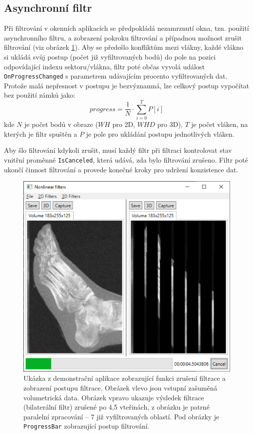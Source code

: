 \subsection*{Asynchronní filtr}
Při filtrování v okenních aplikacích se předpokládá nezamrznutí okna, tzn. použití asynchronního filtru, a zobrazení pokroku filtrování a případnou možnost zrušit filtrování (viz obrázek \ref{fig:impl:demo_cancel}).
Aby se předešlo konfliktům mezi vlákny, každé vlákno si ukládá svůj postup (počet již vyfiltrovaných bodů) do pole na pozici odpovídající indexu sektoru/vlákna, filtr poté občas vyvolá událost \texttt{OnProgressChanged} s parametrem udávajícím procento vyfiltrovaných dat. Protože malá nepřesnost v postupu je bezvýznamná, lze celkový postup vypočítat bez použití zámků jako:
\begin{equation*}
    progress = \frac{1}{N} \cdot \displaystyle\sum_{i=0}^T{P[i]}
\end{equation*}
kde $N$ je počet bodů v obraze ($WH$ pro 2D, $WHD$ pro 3D), $T$ je počet vláken, na kterých je filtr spuštěn a $P$ je pole pro ukládání postupu jednotlivých vláken. 

Aby šlo filtrování kdykoli zrušit, musí každý filtr při filtraci kontrolovat stav vnitřní proměnné \texttt{IsCanceled}, která udává, zda bylo filtrování zrušeno. Filtr poté ukončí činnost filtrování a provede konečné kroky pro udržení konzistence dat.

\begin{figure} [H]
    \centering
    \label{fig:impl:demo_cancel}
    \includegraphics[width=1\textwidth]{figures/demo_cancel.png}
    \caption{Ukázka z demonstrační aplikace zobrazující funkci zrušení filtrace a zobrazení postupu filtrace. Obrázek vlevo jsou vstupní zašuměná volumetrická data. Obrázek vpravo ukazuje výsledek filtrace (bilaterální filtr) zrušené po 4,5 vteřinách, z obrázku je patrné paralelní zpracování -- 7 již vyfiltrovaných oblastí. Pod obrázky je \texttt{ProgressBar} zobrazující postup filtrování.}
\end{figure}

